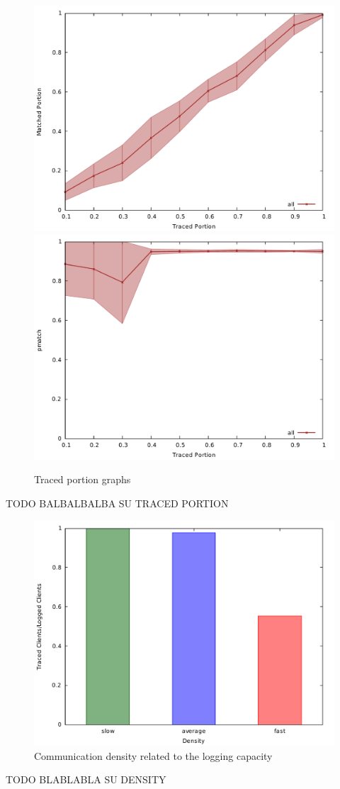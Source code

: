 \begin{figure}[H]
\centering
\includegraphics[scale=0.35]{graphs/cs_tport_mport.pdf}
\includegraphics[scale=0.35]{graphs/cs_tport_pmatch.pdf}
\caption{Traced portion graphs}
\label{fig:g_tport}
\end{figure}

TODO BALBALBALBA SU TRACED PORTION


\begin{figure}[H]
\centering
\includegraphics[scale=0.35]{graphs/density_clients_ration.pdf}
\caption{Communication density related to the logging capacity}
\label{fig:g_density}
\end{figure}

TODO BLABLABLA SU DENSITY
